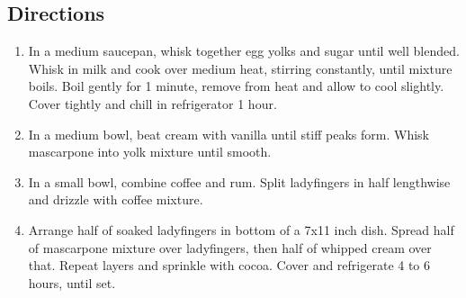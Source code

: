 \documentclass[oneside,11pt]{book}
\newcommand{\Directions}[1]{
	\subsection*{Directions}
	\begin{enumerate} 
	  #1 
	\end{enumerate}
}
\begin{document}
        \Directions{
            \item In a medium saucepan, whisk together egg yolks and sugar until well blended. 
                Whisk in milk and cook over medium heat, stirring constantly, until mixture boils. 
                Boil gently for 1 minute, remove from heat and allow to cool slightly. 
                Cover tightly and chill in refrigerator 1 hour.
            \item In a medium bowl, beat cream with vanilla until stiff peaks form. 
                Whisk mascarpone into yolk mixture until smooth.
            \item In a small bowl, combine coffee and rum. 
                Split ladyfingers in half lengthwise and drizzle with coffee mixture.
            \item Arrange half of soaked ladyfingers in bottom of a 7x11 inch dish. 
                Spread half of mascarpone mixture over ladyfingers, then half of whipped cream over that. 
                Repeat layers and sprinkle with cocoa. Cover and refrigerate 4 to 6 hours, until set.
        }
\end{document}
